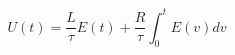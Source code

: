 \documentclass{article}
\begin{document}
$$
U(t) = \frac{L}{\tau}E(t) + \frac{R}{\tau}\int_0^t E(v) dv
$$
\end{document}
